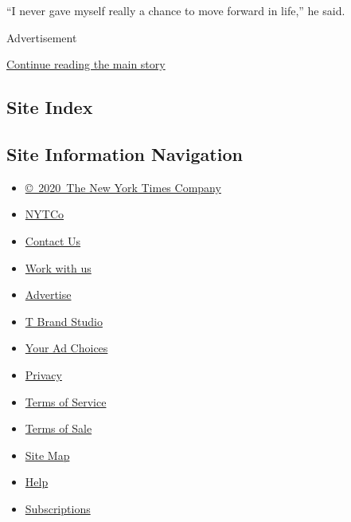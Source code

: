 ``I never gave myself really a chance to move forward in life,'' he
said.

Advertisement

\protect\hyperlink{after-bottom}{Continue reading the main story}

\hypertarget{site-index}{%
\subsection{Site Index}\label{site-index}}

\hypertarget{site-information-navigation}{%
\subsection{Site Information
Navigation}\label{site-information-navigation}}

\begin{itemize}
\tightlist
\item
  \href{https://help.nytimes.com/hc/en-us/articles/115014792127-Copyright-notice}{©~2020~The
  New York Times Company}
\end{itemize}

\begin{itemize}
\tightlist
\item
  \href{https://www.nytco.com/}{NYTCo}
\item
  \href{https://help.nytimes.com/hc/en-us/articles/115015385887-Contact-Us}{Contact
  Us}
\item
  \href{https://www.nytco.com/careers/}{Work with us}
\item
  \href{https://nytmediakit.com/}{Advertise}
\item
  \href{http://www.tbrandstudio.com/}{T Brand Studio}
\item
  \href{https://www.nytimes.com/privacy/cookie-policy\#how-do-i-manage-trackers}{Your
  Ad Choices}
\item
  \href{https://www.nytimes.com/privacy}{Privacy}
\item
  \href{https://help.nytimes.com/hc/en-us/articles/115014893428-Terms-of-service}{Terms
  of Service}
\item
  \href{https://help.nytimes.com/hc/en-us/articles/115014893968-Terms-of-sale}{Terms
  of Sale}
\item
  \href{https://spiderbites.nytimes.com}{Site Map}
\item
  \href{https://help.nytimes.com/hc/en-us}{Help}
\item
  \href{https://www.nytimes.com/subscription?campaignId=37WXW}{Subscriptions}
\end{itemize}
